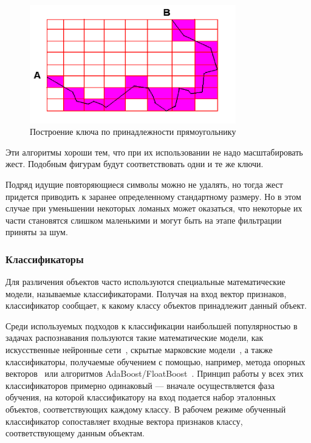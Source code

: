 \documentclass[a5paper]{article}
\begin{document}
\begin{figure} [ht]
  \begin{center}
    \includegraphics[width=0.8\textwidth, bb=0 0 544 390]{03-squares.png}
    \caption{Построение ключа по принадлежности прямоугольнику}
    \label{squares}
  \end{center}
\end{figure}

Эти алгоритмы хороши тем, что при их использовании не надо масштабировать жест. Подобным фигурам будут соответствовать одни и те же ключи.

Подряд идущие повторяющиеся символы можно не удалять, но тогда жест придется приводить к заранее определенному стандартному размеру. Но в этом случае при уменьшении некоторых ломаных может оказаться, что некоторые их части становятся слишком маленькими и
могут быть на этапе фильтрации приняты за шум.

\subsubsection{Классификаторы}
Для различения объектов часто используются специальные математические модели, называемые классификаторами. Получая на вход вектор признаков, классификатор сообщает, к какому классу объектов принадлежит данный объект. 

Среди используемых подходов к классификации наибольшей популярностью в задачах распознавания пользуются такие математические модели, как искусственные нейронные сети~\cite{neuronet1, neuronet2, neuronet3}, скрытые марковские модели~\cite{hmm1, hmm2, hmm3}, а также классификаторы, получаемые обучением с помощью, например, метода опорных векторов~\cite{svm1, svm2} или алгоритмов AdaBoost/FloatBoost~\cite{boosting1, boosting2}. Принцип работы у всех этих классификаторов примерно одинаковый --- вначале осуществляется фаза обучения, на которой классификатору на вход подается набор эталонных объектов, соответствующих каждому классу. В рабочем режиме обученный классификатор сопоставляет входные вектора признаков классу, соответствующему данным объектам.
\end{document}
